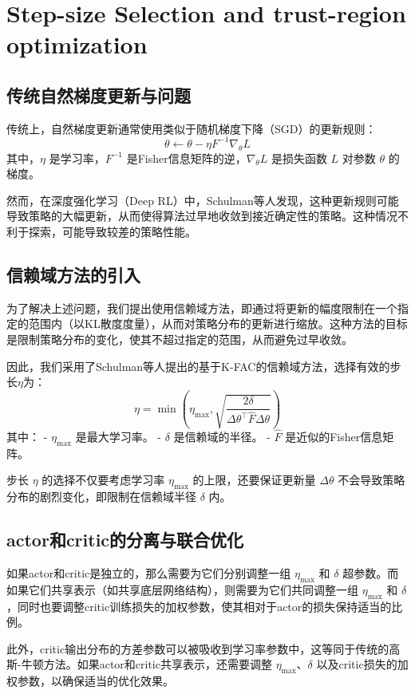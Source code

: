 \documentclass[twocolumn, 10pt]{article} %
\theoremstyle{remark}
\begin{document}
\section{Step-size Selection and trust-region optimization}

\subsection{传统自然梯度更新与问题}
传统上，自然梯度更新通常使用类似于随机梯度下降（SGD）的更新规则：
\[
\theta \leftarrow \theta - \eta F^{-1} \nabla_\theta L
\]
其中，\(\eta\) 是学习率，\(F^{-1}\) 是Fisher信息矩阵的逆，\(\nabla_\theta L\) 是损失函数 \(L\) 对参数 \(\theta\) 的梯度。

然而，在深度强化学习（Deep RL）中，Schulman等人发现，这种更新规则可能导致策略的大幅更新，从而使得算法过早地收敛到接近确定性的策略。这种情况不利于探索，可能导致较差的策略性能。

\subsection{信赖域方法的引入}
为了解决上述问题，我们提出使用信赖域方法，即通过将更新的幅度限制在一个指定的范围内（以KL散度度量），从而对策略分布的更新进行缩放。这种方法的目标是限制策略分布的变化，使其不超过指定的范围，从而避免过早收敛。

因此，我们采用了Schulman等人提出的基于K-FAC的信赖域方法，选择有效的步长\(\eta\)为：
\[
\eta = \min\left(\eta_{\text{max}}, \sqrt{\frac{2\delta}{\Delta \theta^\top \hat{F} \Delta \theta}}\right)
\]
其中：
- \(\eta_{\text{max}}\) 是最大学习率。
- \(\delta\) 是信赖域的半径。
- \(\hat{F}\) 是近似的Fisher信息矩阵。

步长 \(\eta\) 的选择不仅要考虑学习率 \(\eta_{\text{max}}\) 的上限，还要保证更新量 \(\Delta \theta\) 不会导致策略分布的剧烈变化，即限制在信赖域半径 \(\delta\) 内。

\subsection{actor和critic的分离与联合优化}
如果actor和critic是独立的，那么需要为它们分别调整一组 \(\eta_{\text{max}}\) 和 \(\delta\) 超参数。而如果它们共享表示（如共享底层网络结构），则需要为它们共同调整一组 \(\eta_{\text{max}}\) 和 \(\delta\)，同时也要调整critic训练损失的加权参数，使其相对于actor的损失保持适当的比例。

此外，critic输出分布的方差参数可以被吸收到学习率参数中，这等同于传统的高斯-牛顿方法。如果actor和critic共享表示，还需要调整 \(\eta_{\text{max}}\)、\(\delta\) 以及critic损失的加权参数，以确保适当的优化效果。
\end{document}
